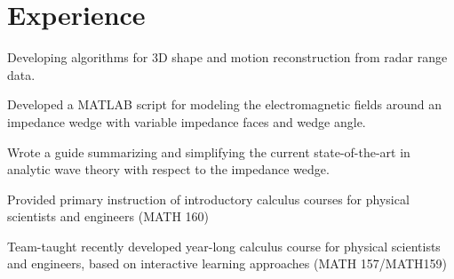 \documentclass[letterpaper]{pine-resume} %
\begin{document}
\begin{minipage}[t]{0.66\textwidth} %


\section{Experience}


\vspace{\topsep} %
\begin{tightitemize}
\item Developing algorithms for 3D shape and motion reconstruction from radar range data.
\end{tightitemize}

\sectionspace %



\vspace{\topsep} %
\begin{tightitemize}
\item Developed a MATLAB script for modeling the electromagnetic fields around an impedance wedge with variable impedance faces and wedge angle.
\item Wrote a guide summarizing and simplifying the current state-of-the-art in analytic wave theory with respect to the impedance wedge.
\end{tightitemize}

\sectionspace %



\begin{tightitemize}
\item Provided primary instruction of introductory calculus courses for physical scientists and engineers (MATH 160)
\item Team-taught recently developed year-long calculus course for physical scientists and engineers, based on interactive learning approaches (MATH 157/MATH159)
\end{tightitemize}


\end{minipage}
\end{document}
